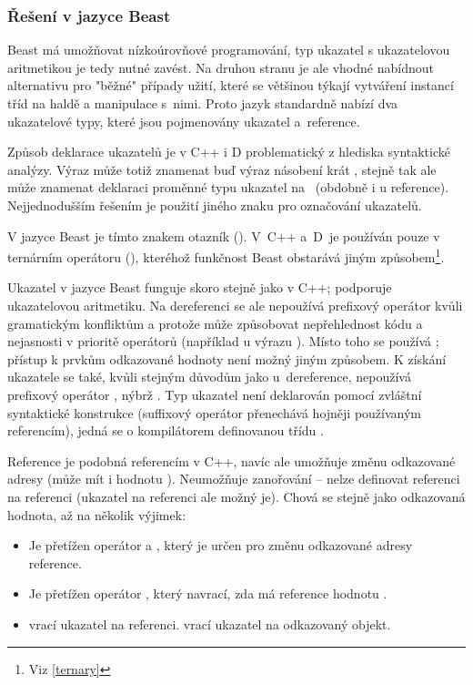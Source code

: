 \subsubsection{Řešení v jazyce Beast} 
Beast má umožňovat nízkoúrovňové programování, typ ukazatel s ukazatelovou aritmetikou je tedy nutné zavést. Na druhou stranu je ale vhodné nabídnout alternativu pro "běžné" případy užití, které se většinou týkají vytváření instancí tříd na haldě a manipulace s~nimi. Proto jazyk standardně nabízí dva ukazatelové typy, které jsou pojmenovány ukazatel a~reference.

Způsob deklarace ukazatelů je v C++ i D problematický z hlediska syntaktické analýzy. Výraz  může totiž znamenat buď výraz násobení  krát , stejně tak ale může znamenat deklaraci proměnné  typu ukazatel na ~(obdobně i u reference). Nejjednodušším řešením je použití jiného znaku pro označování ukazatelů.

V jazyce Beast je tímto znakem otazník (). V~C++ a~D~je používán pouze v ternárním operátoru (), kteréhož funkčnost Beast obstarává jiným způsobem\footnote{Viz \autoref{ternary}}.

Ukazatel v jazyce Beast funguje skoro stejně jako v C++; podporuje ukazatelovou aritmetiku. Na dereferenci se ale nepoužívá prefixový operátor  kvůli gramatickým konfliktům a protože může způsobovat nepřehlednost kódu a nejasnosti v prioritě operátorů (například u výrazu ). Místo toho se používá ; přístup k prvkům odkazované hodnoty není možný jiným způsobem. K získání ukazatele se také, kvůli stejným důvodům jako u~dereference, nepoužívá prefixový operátor , nýbrž . Typ ukazatel není deklarován pomocí zvláštní syntaktické konstrukce (suffixový operátor  přenechává hojněji používaným referencím), jedná se o kompilátorem definovanou třídu .

Reference je podobná referencím v C++, navíc ale umožňuje změnu odkazované adresy (může mít i hodnotu ). Neumožňuje zanořování -- nelze definovat referenci na referenci (ukazatel na referenci ale možný je). Chová se stejně jako odkazovaná hodnota, až na několik výjimek:
\begin{itemize}
	\item Je přetížen operátor  a , který je určen pro změnu odkazované adresy reference.
	\item Je přetížen operátor , který navrací, zda má reference hodnotu .
	\item {} vrací ukazatel na referenci.  vrací ukazatel na odkazovaný objekt.
\end{itemize}


